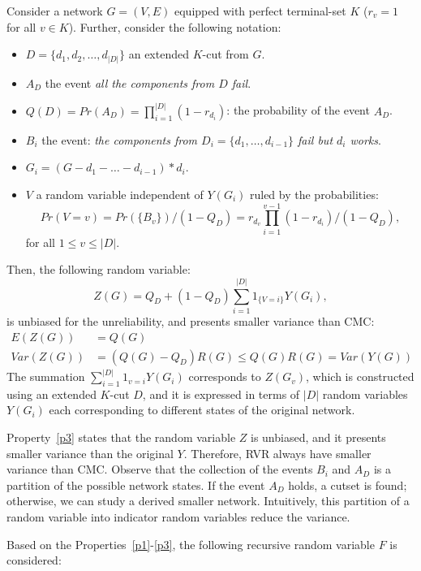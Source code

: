 \begin{property}\label{p3}
Consider a network $G=(V,E)$ equipped with perfect terminal-set $K$ ($r_v=1$ for all $v\in K$). 
Further, consider the following notation:
\begin{itemize}
\item $D = \{d_1,d_2,\ldots,d_{|D|}\}$ an extended $K$-cut from $G$. 
\item $A_D$ the event \emph{all the components from $D$ fail}.
\item $Q(D) = Pr(A_D) = \prod_{i=1}^{|D|}(1-r_{d_i})$: the probability of the event $A_D$.
\item $B_i$ the event: \emph{the components from $D_i=\{d_1,\ldots,d_{i-1}\}$ fail but $d_i$ works}.
\item $G_i = (G - d_1-\ldots - d_{i-1})*d_i$.
\item $V$ a random variable independent of $Y(G_i)$ ruled by the probabilities:
\begin{equation*}
Pr(V=v)=Pr(\{B_v\})/(1-Q_D) = r_{d_v} \prod_{i=1}^{v-1}(1-r_{d_i})/(1-Q_D),
\end{equation*}
for all $1\leq v\leq |D|$.
\end{itemize}
Then, the following random variable:
\begin{equation*}
Z(G) = Q_D + (1-Q_D)\sum_{i=1}^{|D|}1_{\{V=i\}}Y(G_i),
\end{equation*} 
is unbiased for the unreliability, and presents smaller variance than CMC:
\begin{align*}
E(Z(G))&=Q(G)\\
Var(Z(G)) &= (Q(G)-Q_D)R(G)\leq Q(G)R(G)=Var(Y(G))
\end{align*} 
The summation $\sum_{i=1}^{|D|}1_{v=i}Y(G_i)$ corresponds to $Z(G_v)$, which is 
constructed using an extended $K$-cut $D$, and it is expressed in terms of $|D|$ 
random variables $Y(G_i)$ each corresponding to different states of the original network.
\end{property}

Property~\ref{p3} states that the random variable $Z$ is unbiased, and it presents smaller 
variance than the original $Y$. Therefore, RVR always have smaller variance than CMC. 
Observe that the collection of the events $B_i$ and $A_D$ is a partition of the possible network 
states. If the event $A_D$ holds, a cutset is found; otherwise, we can study a derived smaller network. 
Intuitively, this partition of a random variable into indicator random variables reduce the variance. 

Based on the Properties~\ref{p1}-\ref{p3}, the following recursive random variable $F$ is considered:

